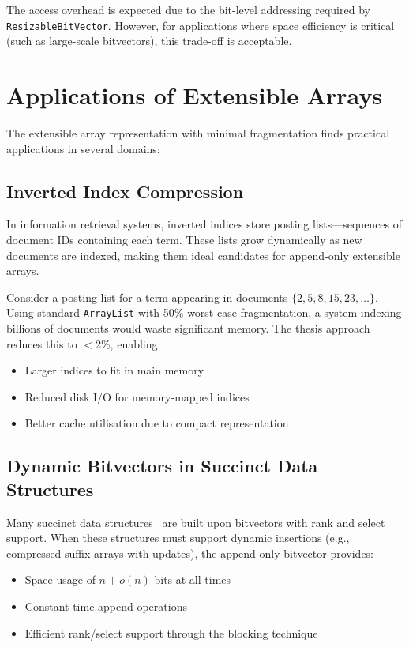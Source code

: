 The access overhead is expected due to the bit-level addressing required by \texttt{ResizableBitVector}. However, for applications where space efficiency is critical (such as large-scale bitvectors), this trade-off is acceptable.

\FloatBarrier
\section{Applications of Extensible Arrays}
\label{sec:ea-applications}

The extensible array representation with minimal fragmentation finds practical applications in several domains:

\subsection{Inverted Index Compression}

In information retrieval systems, inverted indices store posting lists—sequences of document IDs containing each term. These lists grow dynamically as new documents are indexed, making them ideal candidates for append-only extensible arrays.

Consider a posting list for a term appearing in documents $\{2, 5, 8, 15, 23, \ldots\}$. Using standard \texttt{ArrayList} with 50\% worst-case fragmentation, a system indexing billions of documents would waste significant memory. The thesis approach reduces this to $<$2\%, enabling:
\begin{itemize}
    \item Larger indices to fit in main memory
    \item Reduced disk I/O for memory-mapped indices
    \item Better cache utilisation due to compact representation
\end{itemize}

\subsection{Dynamic Bitvectors in Succinct Data Structures}

Many succinct data structures~\cite{Jacobson_1989, Navarro_2016} are built upon bitvectors with rank and select support. When these structures must support dynamic insertions (e.g., compressed suffix arrays with updates), the append-only bitvector provides:
\begin{itemize}
    \item Space usage of $n + o(n)$ bits at all times
    \item Constant-time append operations
    \item Efficient rank/select support through the blocking technique
\end{itemize}

